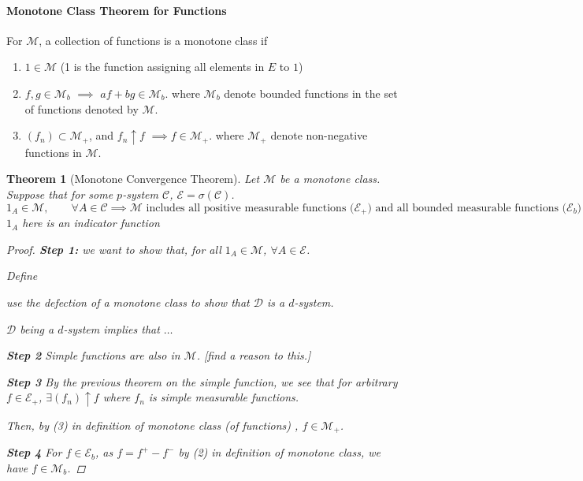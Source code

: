 \documentclass[11pt]{article}
\newtheorem{theorem}{Theorem}[subsection]
\begin{document}
\paragraph{Monotone Class Theorem for Functions}
\begin{definition}
  For $\mathcal M$, a collection of functions is a monotone class if 
  \begin{enumerate}
    \item $1 \in \mathcal M$ (1 is the function assigning all elements in $E$ to
      $1$)
    \item $f, g \in \mathcal M_b$ $\implies$ $a f + b g \in \mathcal M_b$. 
      where $\mathcal M_b$ denote bounded functions in the set of functions
      denoted by $\mathcal M$. 

    \item $\left( f_n \right) \subset \mathcal M_ + $, and $f_n \uparrow f$
      $\implies f \in \mathcal M _ +$. 
      where $\mathcal M _ + $ denote non-negative functions in $\mathcal M$. 
  \end{enumerate}
\end{definition}

\begin{theorem}[Monotone Convergence Theorem]
  Let $\mathcal M$ be a monotone class. Suppose that for some $p$-system
  $\mathcal C$, $\mathcal E = \sigma (\mathcal C)$. 
  \[ 1 _ A \in \mathcal M, \qquad \forall A \in \mathcal C \implies \mathcal M
  \text{ includes all positive measurable functions ($\mathcal E_+$) and all bounded measurable
  functions ($\mathcal E_b$)}\]
  $1_A$ here is an indicator function


  \begin{proof}
    \textbf{Step 1:} we want to show that, for all $1 _ A \in \mathcal M$,
    $\forall A \in \mathcal E$.

    Define 

    use the defection of a monotone class to show that $\mathcal D$ is a
    $d$-system. 
    \label{homework_02}

    $\mathcal D$ being a $d$-system implies that $\mathcal \dots$

    \textbf{Step 2} Simple functions are also in $\mathcal M$. [find a reason to
    this.]

    \textbf{Step 3} By the previous theorem on the simple function, we see that
    for arbitrary $f \in \mathcal E _ + $, $\exists \left( f_n \right) \uparrow
    f$ where $f_n$ is simple measurable functions.  

    Then, by (3) in definition of monotone class (of functions) , $f \in
    \mathcal M_+$. 

    \textbf{Step 4} For $f \in \mathcal E_b$, as $f = f^+ - f^-$ by (2) in
    definition of monotone class, we have $f \in \mathcal M_b$. 
  \end{proof}
 
\end{theorem}
\end{document}
